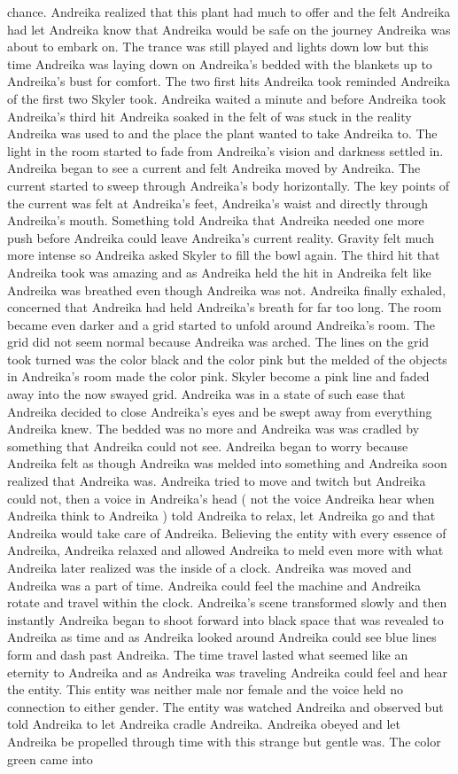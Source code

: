 \documentclass[12pt]{book}
\begin{document}
chance. Andreika realized that this plant had much to offer and the felt Andreika had let Andreika know that Andreika would be safe on the journey Andreika was about to embark on. The trance was still played and lights down low but this time Andreika was laying down on Andreika's bedded with the blankets up to Andreika's bust for comfort. The two first hits Andreika took reminded Andreika of the first two Skyler took. Andreika waited a minute and before Andreika took Andreika's third hit Andreika soaked in the felt of was stuck in the reality Andreika was used to and the place the plant wanted to take Andreika to. The light in the room started to fade from Andreika's vision and darkness settled in. Andreika began to see a current and felt Andreika moved by Andreika. The current started to sweep through Andreika's body horizontally. The key points of the current was felt at Andreika's feet, Andreika's waist and directly through Andreika's mouth. Something told Andreika that Andreika needed one more push before Andreika could leave Andreika's current reality. Gravity felt much more intense so Andreika asked Skyler to fill the bowl again. The third hit that Andreika took was amazing and as Andreika held the hit in Andreika felt like Andreika was breathed even though Andreika was not. Andreika finally exhaled, concerned that Andreika had held Andreika's breath for far too long. The room became even darker and a grid started to unfold around Andreika's room. The grid did not seem normal because Andreika was arched. The lines on the grid took turned was the color black and the color pink but the melded of the objects in Andreika's room made the color pink. Skyler become a pink line and faded away into the now swayed grid. Andreika was in a state of such ease that Andreika decided to close Andreika's eyes and be swept away from everything Andreika knew. The bedded was no more and Andreika was was cradled by something that Andreika could not see. Andreika began to worry because Andreika felt as though Andreika was melded into something and Andreika soon realized that Andreika was. Andreika tried to move and twitch but Andreika could not, then a voice in Andreika's head ( not the voice Andreika hear when Andreika think to Andreika ) told Andreika to relax, let Andreika go and that Andreika would take care of Andreika. Believing the entity with every essence of Andreika, Andreika relaxed and allowed Andreika to meld even more with what Andreika later realized was the inside of a clock. Andreika was moved and Andreika was a part of time. Andreika could feel the machine and Andreika rotate and travel within the clock. Andreika's scene transformed slowly and then instantly Andreika began to shoot forward into black space that was revealed to Andreika as time and as Andreika looked around Andreika could see blue lines form and dash past Andreika. The time travel lasted what seemed like an eternity to Andreika and as Andreika was traveling Andreika could feel and hear the entity. This entity was neither male nor female and the voice held no connection to either gender. The entity was watched Andreika and observed but told Andreika to let Andreika cradle Andreika. Andreika obeyed and let Andreika be propelled through time with this strange but gentle was. The color green came into 
\end{document}
